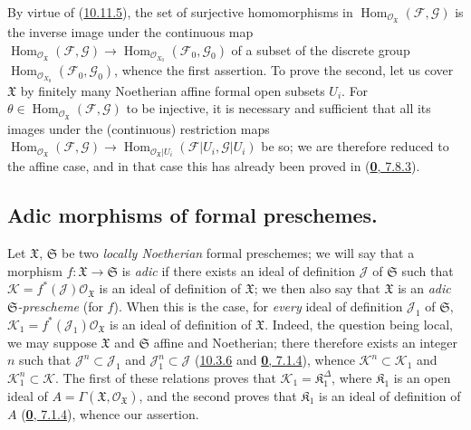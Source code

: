 By virtue of (\hyperref[I.10.11.5]{10.11.5}), the set of
surjective homomorphisms in
$\operatorname{Hom}_{\mathscr{O}_{\mathfrak{X}}}
(\mathscr{F},\mathscr{G})$ is the inverse image under the continuous
map
$\operatorname{Hom}_{\mathscr{O}_{\mathfrak{X}}}
(\mathscr{F},\mathscr{G})\to
\operatorname{Hom}_{\mathscr{O}_{X_0}}(\mathscr{F}_0,\mathscr{G}_0)$
of a subset of the discrete group
$\operatorname{Hom}_{\mathscr{O}_{X_0}}(\mathscr{F}_0,\mathscr{G}_0)$,
whence the first assertion. To prove the second, let us cover
$\mathfrak{X}$ by finitely many Noetherian affine formal open subsets
$U_i$. For
$\theta\in\operatorname{Hom}_{\mathscr{O}_{\mathfrak{X}}}
(\mathscr{F},\mathscr{G})$ to be injective, it is necessary and sufficient
that all its images under the (continuous) restriction maps
$\operatorname{Hom}_{\mathscr{O}_{\mathfrak{X}}}
(\mathscr{F},\mathscr{G})\to
\operatorname{Hom}_{\mathscr{O}_{\mathfrak{X}}|U_i}
(\mathscr{F}|U_i,\mathscr{G}|U_i)$ be so; we are therefore reduced to the
affine case, and in that case this has already been proved in
(\hyperref[0.7.8.3]{\textbf{0}, 7.8.3}).


\subsection{Adic morphisms of formal preschemes.}
\label{subsection:I.10.12}

\begin{env}[10.12.1]
\label{I.10.12.1}
Let $\mathfrak{X}$, $\mathfrak{S}$ be two \emph{locally Noetherian}
formal preschemes; we will say that a morphism
$f:\mathfrak{X}\to\mathfrak{S}$ is \emph{adic} if there exists an ideal
of definition $\mathscr{J}$ of $\mathfrak{S}$ such that
$\mathscr{K}=f^*(\mathscr{J})\mathscr{O}_{\mathfrak{X}}$ is an ideal of
definition of $\mathfrak{X}$; we then also say that $\mathfrak{X}$ is
an \emph{adic $\mathfrak{S}$-prescheme} (for $f$). When this is
the case, for \emph{every} ideal of definition $\mathscr{J}_1$ of
$\mathfrak{S}$,
$\mathscr{K}_1=f^*(\mathscr{J}_1)\mathscr{O}_{\mathfrak{X}}$ is an ideal
of definition of $\mathfrak{X}$. Indeed, the question being local, we
may suppose $\mathfrak{X}$ and $\mathfrak{S}$ affine and Noetherian; there
therefore exists an integer $n$ such that $\mathscr{J}^n\subset\mathscr{J}_1$ and
$\mathscr{J}_1^n\subset\mathscr{J}$
(\hyperref[I.10.3.6]{10.3.6} and
\hyperref[0.7.1.4]{\textbf{0}, 7.1.4}), whence
$\mathscr{K}^n\subset\mathscr{K}_1$ and
$\mathscr{K}_1^n\subset\mathscr{K}$. The first of these relations proves
that $\mathscr{K}_1=\mathfrak{K}_1^\Delta$, where $\mathfrak{K}_1$ is an
open ideal of
$A=\Gamma(\mathfrak{X},\mathscr{O}_{\mathfrak{X}})$, and the second proves
that $\mathfrak{K}_1$ is an ideal of definition of $A$
(\hyperref[0.7.1.4]{\textbf{0}, 7.1.4}), whence our assertion.
\end{env}

